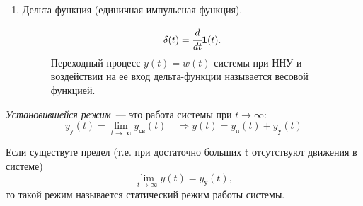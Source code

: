 \begin{enumerate}
    \item Дельта функция (единичная импульсная функция).
    \begin{figure}[!h]
        \begin{minipage}[!h]{0.5\linewidth}
        \end{minipage}
        \begin{minipage}[!h]{0.5\linewidth}
            \begin{equation}
                \mathbf{\delta}(t) = \cfrac{d}{dt} \mathbf{1}(t).
            \end{equation}
            Переходный процесс $y(t) = w(t)$ системы при ННУ и воздействии на ее вход дельта-функции называется весовой функцией.
        \end{minipage}
    \end{figure}
\end{enumerate}

\textit{Установившейся режим}~--- это работа системы при $t \rightarrow \infty$:
\begin{equation}
    y_{\text{у}}(t) = \lim\limits_{t \rightarrow \infty} y_{\text{св}}(t)
    \quad\Rightarrow
    y(t) = y_{\text{п}}(t) + y_{\text{у}}(t)
\end{equation}

Если существуте предел (т.е. при достаточно больших t отсутствуют движения в системе)
\begin{equation}
    \lim\limits_{t \rightarrow \infty} y(t) = y_{\text{у}}(t),
\end{equation}
то такой режим называется статический режим работы системы.